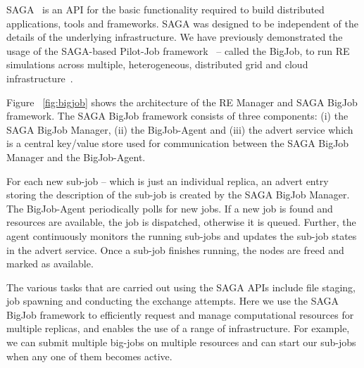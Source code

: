 \documentclass{rspublic}
\newcommand{\alnote}[1]{ {\textcolor{blue} { ***andre: #1 }}}
\newcommand{\athotanote}[1]{ {\textcolor{green} { ***athota: #1 }}}
\newcommand{\alnote}[1]{}
\newcommand{\athotanote}[1]{}
\begin{document}
SAGA~\citep{saga-url} %
is an API for the basic functionality required to build distributed
applications, tools and frameworks. SAGA was designed to be independent of the
details of the underlying infrastructure.  We have previously demonstrated the
usage of the SAGA-based Pilot-Job
framework~\citep{saga_bigjob_condor_cloud} -- called the BigJob, to
run RE simulations across multiple, heterogeneous, distributed grid
and cloud infrastructure~\citep{Luckow:2008fp}. 


Figure ~\ref{fig:bigjob} shows the architecture of the RE Manager and
SAGA BigJob framework. The SAGA BigJob framework consists of three
components: (i) the SAGA BigJob Manager, (ii) the BigJob-Agent and
(iii) the advert service which is a central key/value store used for
communication between the SAGA BigJob Manager and the BigJob-Agent.

For each new sub-job -- which is just an individual replica, an advert
entry storing the description of the sub-job is created by the
SAGA BigJob Manager. The BigJob-Agent periodically polls for new jobs. If a
new job is found and resources are available, the job is dispatched,
otherwise it is queued.  Further, the agent continuously monitors the
running sub-jobs and updates the sub-job states in the advert
service. Once a sub-job finishes running, the nodes are freed and
marked as available.

The various tasks that are carried out using the SAGA APIs include
file staging, job spawning and conducting the exchange attempts. Here
we use the SAGA BigJob framework to efficiently request and manage
computational resources for multiple replicas, and enables the use of
a range of infrastructure.  For example, we can submit multiple
big-jobs on multiple resources and can start our sub-jobs when any one
of them becomes active.



\end{document}
